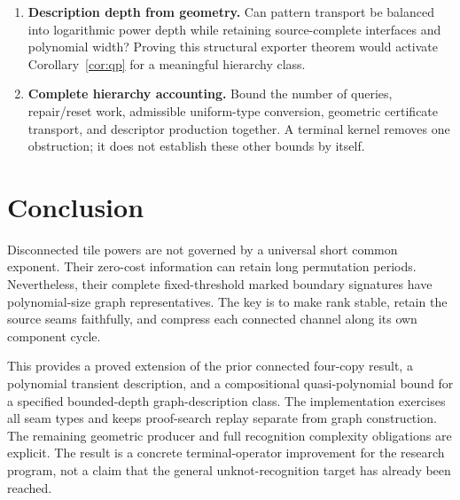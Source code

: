 \documentclass[11pt]{article}
\theoremstyle{remark}\newtheorem{remark}[theorem]{Remark}
\begin{document}
\begin{enumerate}[leftmargin=*,itemsep=.65em]
\item \textbf{Description depth from geometry.} Can pattern transport be balanced into logarithmic power depth while retaining source-complete interfaces and polynomial width? Proving this structural exporter theorem would activate Corollary~\ref{cor:qp} for a meaningful hierarchy class.
\item \textbf{Complete hierarchy accounting.} Bound the number of queries, repair/reset work, admissible uniform-type conversion, geometric certificate transport, and descriptor production together. A terminal kernel removes one obstruction; it does not establish these other bounds by itself.
\end{enumerate}

\section{Conclusion}
Disconnected tile powers are not governed by a universal short common exponent. Their zero-cost information can retain long permutation periods. Nevertheless, their complete fixed-threshold marked boundary signatures have polynomial-size graph representatives. The key is to make rank stable, retain the source seams faithfully, and compress each connected channel along its own component cycle.

This provides a proved extension of the prior connected four-copy result, a polynomial transient description, and a compositional quasi-polynomial bound for a specified bounded-depth graph-description class. The implementation exercises all seam types and keeps proof-search replay separate from graph construction. The remaining geometric producer and full recognition complexity obligations are explicit. The result is a concrete terminal-operator improvement for the research program, not a claim that the general unknot-recognition target has already been reached.

\appendix
\end{document}
